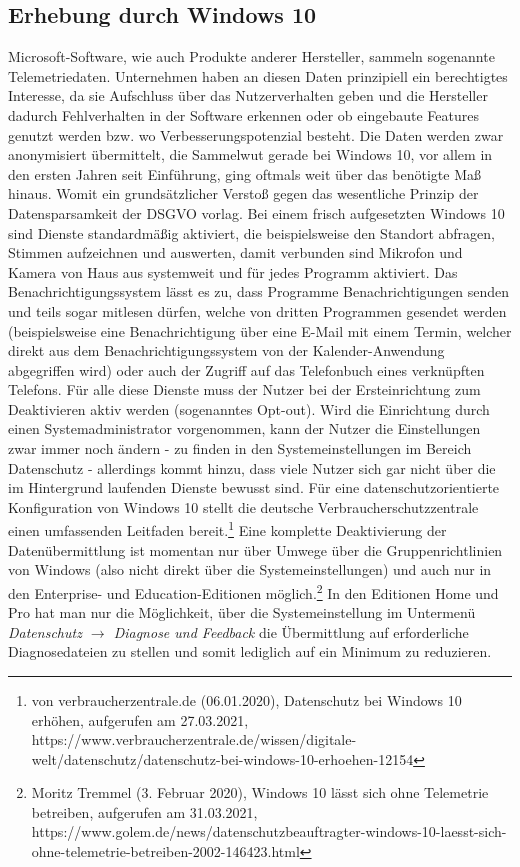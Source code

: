 \subsection{Erhebung durch Windows 10}
Microsoft-Software, wie auch Produkte anderer Hersteller, sammeln sogenannte Telemetriedaten. Unternehmen haben an diesen Daten prinzipiell ein berechtigtes Interesse, da sie Aufschluss über das Nutzerverhalten geben und die Hersteller dadurch Fehlverhalten in der Software erkennen oder ob eingebaute Features genutzt werden bzw. wo Verbesserungspotenzial besteht. Die Daten werden zwar anonymisiert übermittelt, die Sammelwut gerade bei Windows 10, vor allem in den ersten Jahren seit Einführung, ging oftmals weit über das benötigte Maß hinaus. Womit ein grundsätzlicher Verstoß gegen das wesentliche Prinzip der Datensparsamkeit der DSGVO vorlag. Bei einem frisch aufgesetzten Windows 10 sind Dienste standardmäßig aktiviert, die beispielsweise den Standort abfragen, Stimmen aufzeichnen und auswerten, damit verbunden sind Mikrofon und Kamera von Haus aus systemweit und für jedes Programm aktiviert. Das Benachrichtigungssystem lässt es zu, dass Programme Benachrichtigungen senden und teils sogar mitlesen dürfen, welche von dritten Programmen gesendet werden (beispielsweise eine Benachrichtigung über eine E-Mail mit einem Termin, welcher direkt aus dem Benachrichtigungssystem von der Kalender-Anwendung abgegriffen wird) oder auch der Zugriff auf das Telefonbuch eines verknüpften Telefons. Für alle diese Dienste muss der Nutzer bei der Ersteinrichtung zum Deaktivieren aktiv werden (sogenanntes Opt-out). Wird die Einrichtung durch einen Systemadministrator vorgenommen, kann der Nutzer die Einstellungen zwar immer noch ändern - zu finden in den Systemeinstellungen im Bereich \glqq Datenschutz\grqq{} - allerdings kommt hinzu, dass viele Nutzer sich gar nicht über die im Hintergrund laufenden Dienste bewusst sind. Für eine datenschutzorientierte Konfiguration von Windows 10 stellt die deutsche Verbraucherschutzzentrale einen umfassenden Leitfaden bereit.\footnote{von verbraucherzentrale.de (06.01.2020), Datenschutz bei Windows 10 erhöhen, aufgerufen am 27.03.2021, https://www.verbraucherzentrale.de/wissen/digitale-welt/datenschutz/datenschutz-bei-windows-10-erhoehen-12154} Eine komplette Deaktivierung der Datenübermittlung ist momentan nur über Umwege über die Gruppenrichtlinien von Windows (also nicht direkt über die Systemeinstellungen) und auch nur in den Enterprise- und Education-Editionen möglich.\footnote{Moritz Tremmel (3. Februar 2020), Windows 10 lässt sich ohne Telemetrie betreiben, aufgerufen am 31.03.2021, https://www.golem.de/news/datenschutzbeauftragter-windows-10-laesst-sich-ohne-telemetrie-betreiben-2002-146423.html} In den Editionen Home und Pro hat man nur die Möglichkeit, über die Systemeinstellung im Untermenü \textit{Datenschutz $\rightarrow$ Diagnose und Feedback} die Übermittlung auf \glqq erforderliche Diagnosedateien\grqq{} zu stellen und somit lediglich auf ein Minimum zu reduzieren.


